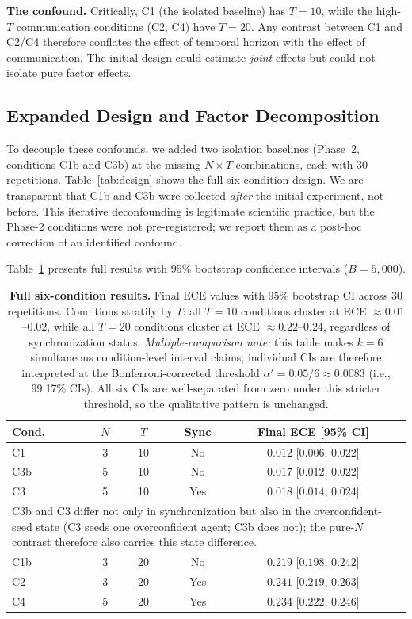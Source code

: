 \documentclass[11pt]{article}
\begin{document}
\textbf{The confound.} Critically, C1 (the isolated baseline) has $T{=}10$, while the high-$T$ communication conditions (C2, C4) have $T{=}20$. Any contrast between C1 and C2/C4 therefore conflates the effect of temporal horizon with the effect of communication. The initial design could estimate \emph{joint} effects but could not isolate pure factor effects.

\subsection{Expanded Design and Factor Decomposition}

To decouple these confounds, we added two isolation baselines (Phase~2, conditions C1b and C3b) at the missing $N{\times}T$ combinations, each with 30 repetitions. Table~\ref{tab:design} shows the full six-condition design. We are transparent that C1b and C3b were collected \emph{after} the initial experiment, not before. This iterative deconfounding is legitimate scientific practice, but the Phase-2 conditions were not pre-registered; we report them as a post-hoc correction of an identified confound.

Table~\ref{tab:results} presents full results with 95\% bootstrap confidence intervals ($B{=}5{,}000$).

\begin{table}[t]
\centering
\caption{\textbf{Full six-condition results.} Final ECE values with 95\% bootstrap CI across 30 repetitions. Conditions stratify by $T$: all $T{=}10$ conditions cluster at ECE $\approx 0.01$--$0.02$, while all $T{=}20$ conditions cluster at ECE $\approx 0.22$--$0.24$, regardless of synchronization status. \emph{Multiple-comparison note:} this table makes $k{=}6$ simultaneous condition-level interval claims; individual CIs are therefore interpreted at the Bonferroni-corrected threshold $\alpha' = 0.05/6 \approx 0.0083$ (i.e., 99.17\% CIs). All six CIs are well-separated from zero under this stricter threshold, so the qualitative pattern is unchanged.}
\label{tab:results}
\begin{tabular}{lccccc}
\toprule
Cond. & $N$ & $T$ & Sync & Final ECE [95\% CI] \\
\midrule
C1  & 3 & 10 & No  & $0.012$ [$0.006$, $0.022$] \\
C3b & 5 & 10 & No  & $0.017$ [$0.012$, $0.022$] \\
C3  & 5 & 10 & Yes & $0.018$ [$0.014$, $0.024$] \\
\multicolumn{5}{l}{\footnotesize C3b and C3 differ not only in synchronization but also in the overconfident-seed state (C3 seeds one overconfident agent; C3b does not); the pure-$N$ contrast therefore also carries this state difference.} \\
\midrule
C1b & 3 & 20 & No  & $0.219$ [$0.198$, $0.242$] \\
C2  & 3 & 20 & Yes & $0.241$ [$0.219$, $0.263$] \\
C4  & 5 & 20 & Yes & $0.234$ [$0.222$, $0.246$] \\
\bottomrule
\end{tabular}
\end{table}
\end{document}

